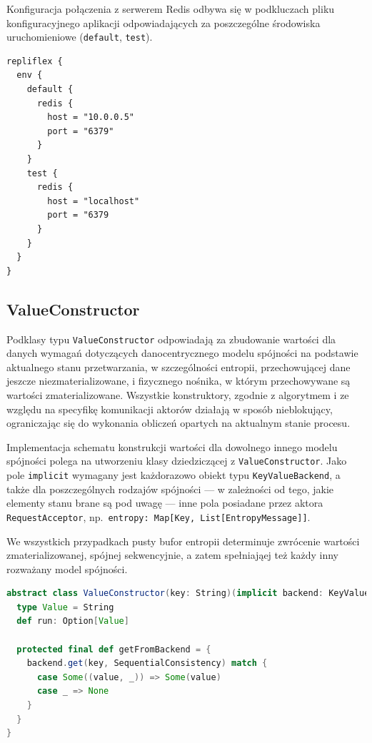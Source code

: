 Konfiguracja połączenia z serwerem Redis odbywa się w podkluczach pliku konfiguracyjnego aplikacji odpowiadających za poszczególne środowiska uruchomieniowe (\texttt{default}, \texttt{test}).

\begin{lstlisting}[caption=Konfiguracja dostępu do serwera bazy danych Redis]
repliflex {
  env {
    default {
      redis {
        host = "10.0.0.5"
        port = "6379"
      }
    }
    test {
      redis {
        host = "localhost"
        port = "6379
      }
    }
  }
}
\end{lstlisting}

\subsection{ValueConstructor} \label{subsection:valueconstructor}

Podklasy typu \texttt{ValueConstructor} odpowiadają za zbudowanie wartości dla danych wymagań dotyczących danocentrycznego modelu spójności na podstawie aktualnego stanu przetwarzania, w szczególności entropii, przechowującej dane jeszcze niezmaterializowane, i fizycznego nośnika, w którym przechowywane są wartości zmaterializowane. Wszystkie konstruktory, zgodnie z algorytmem i ze względu na specyfikę komunikacji aktorów działają w sposób nieblokujący, ograniczając się do wykonania obliczeń opartych na aktualnym stanie procesu.

Implementacja schematu konstrukcji wartości dla dowolnego innego modelu spójności polega na
utworzeniu klasy dziedziczącej z \texttt{ValueConstructor}. Jako pole \texttt{implicit} wymagany
jest każdorazowo obiekt typu \texttt{KeyValueBackend}, a także dla poszczególnych rodzajów spójności
--- w zależności od tego, jakie elementy stanu brane są pod uwagę --- inne pola posiadane przez
aktora \texttt{RequestAcceptor}, np.\ \texttt{entropy: Map[Key, List[EntropyMessage]]}.

We wszystkich przypadkach pusty bufor entropii determinuje zwrócenie wartości zmaterializowanej, spójnej sekwencyjnie, a zatem spełniająej też każdy inny rozważany model spójności.

\begin{lstlisting}[language=Scala, caption=Definicja klasy abstrakcyjnej ValueConstructor]
abstract class ValueConstructor(key: String)(implicit backend: KeyValueBackend) {
  type Value = String
  def run: Option[Value]

  protected final def getFromBackend = {
    backend.get(key, SequentialConsistency) match {
      case Some((value, _)) => Some(value)
      case _ => None
    }
  }
}
\end{lstlisting}

